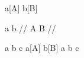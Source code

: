 
%
%




\ex
\begingl
a[A] b[B]
\endgl
\xe

\ex[glstyle=wrap]
\begingl
\gla a b //
\glb A B //
\endgl
\xe

\ex
\begingl
\glpreamble
a b c
\endpreamble
a[A] b[B]
\glft a b c
\endgl
\xe

\bye

%
%
%
%
%
%
%
